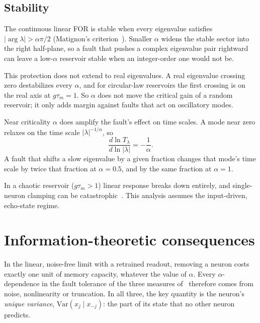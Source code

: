 \documentclass[11pt,a4paper]{article}
\newcommand{\Var}{\mathrm{Var}}
\begin{document}
\subsection{Stability}

The continuous linear FOR is stable when every eigenvalue satisfies $|\arg\lambda| > \alpha\pi/2$ (Matignon's criterion~\cite{matignon1996}). Smaller $\alpha$ widens the stable sector into the right half-plane, so a fault that pushes a complex eigenvalue pair rightward can leave a low-$\alpha$ reservoir stable when an integer-order one would not be.

This protection does not extend to real eigenvalues. A real eigenvalue crossing zero destabilizes every $\alpha$, and for circular-law reservoirs the first crossing is on the real axis at $g\tau_m = 1$. So $\alpha$ does not move the critical gain of a random reservoir; it only adds margin against faults that act on oscillatory modes.

Near criticality $\alpha$ does amplify the fault's effect on time scales. A mode near zero relaxes on the time scale $|\lambda|^{-1/\alpha}$, so
\begin{equation}
\frac{d \ln T_{\lambda}}{d \ln |\lambda|} = -\frac{1}{\alpha}.
\end{equation}
A fault that shifts a slow eigenvalue by a given fraction changes that mode's time scale by twice that fraction at $\alpha = 0.5$, and by the same fraction at $\alpha = 1$.

In a chaotic reservoir ($g\tau_m>1$) linear response breaks down entirely, and single-neuron clamping can be catastrophic~\cite{vincentlamarre2016}. This analysis assumes the input-driven, echo-state regime.

\section{Information-theoretic consequences}
\label{sec:info}

In the linear, noise-free limit with a retrained readout, removing a neuron costs exactly one unit of memory capacity, whatever the value of $\alpha$. Every $\alpha$-dependence in the fault tolerance of the three measures of~\cite{mastin2026} therefore comes from noise, nonlinearity or truncation. In all three, the key quantity is the neuron's \emph{unique variance}, $\Var(x_j \mid x_{-j})$: the part of its state that no other neuron predicts.
\end{document}
